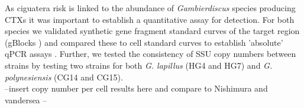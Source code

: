 \documentclass[12pt]{article}
\begin{document}

As ciguatera risk is linked to the abundance of \emph{Gambierdiscus} species producing CTXs it was important to establish a quantitative assay for detection.
For both species we validated synthetic gene fragment standard curves of the target region (gBlocks \textsuperscript{\textregistered}) and compared these to cell standard curves to establish 'absolute' qPCR assays \cite{nishimura2016quantitative,hariganeya2013quantitative}. Further, we tested the consistency of SSU copy numbers between strains by testing two strains for both \emph{G. lapillus} (HG4 and HG7) and \emph{G. polynesiensis} (CG14 and CG15).\\
--insert copy number per cell results here and compare to Nishimura and vandersea --\\ %
\end{document}
